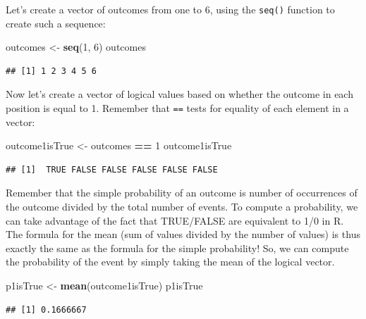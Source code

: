 \documentclass[
  12pt,
]{book}
\newenvironment{Shaded}{\begin{snugshade}}{\end{snugshade}}
\newcommand{\DecValTok}[1]{\textcolor[rgb]{0.00,0.00,0.81}{#1}}
\newcommand{\FunctionTok}[1]{\textcolor[rgb]{0.13,0.29,0.53}{\textbf{#1}}}
\newcommand{\NormalTok}[1]{#1}
\newcommand{\OtherTok}[1]{\textcolor[rgb]{0.56,0.35,0.01}{#1}}
\newcommand{\SpecialCharTok}[1]{\textcolor[rgb]{0.81,0.36,0.00}{\textbf{#1}}}
\begin{document}
Let's create a vector of outcomes from one to 6, using the \texttt{seq()} function to create such a sequence:

\begin{Shaded}
\begin{Highlighting}[]
\NormalTok{outcomes }\OtherTok{\textless{}{-}} \FunctionTok{seq}\NormalTok{(}\DecValTok{1}\NormalTok{, }\DecValTok{6}\NormalTok{)}
\NormalTok{outcomes}
\end{Highlighting}
\end{Shaded}

\begin{verbatim}
## [1] 1 2 3 4 5 6
\end{verbatim}

Now let's create a vector of logical values based on whether the outcome in each position is equal to 1. Remember that \texttt{==} tests for equality of each element in a vector:

\begin{Shaded}
\begin{Highlighting}[]
\NormalTok{outcome1isTrue }\OtherTok{\textless{}{-}}\NormalTok{ outcomes }\SpecialCharTok{==} \DecValTok{1} 
\NormalTok{outcome1isTrue}
\end{Highlighting}
\end{Shaded}

\begin{verbatim}
## [1]  TRUE FALSE FALSE FALSE FALSE FALSE
\end{verbatim}

Remember that the simple probability of an outcome is number of occurrences of the outcome divided by the total number of events. To compute a probability, we can take advantage of the fact that TRUE/FALSE are equivalent to 1/0 in R. The formula for the mean (sum of values divided by the number of values) is thus exactly the same as the formula for the simple probability! So, we can compute the probability of the event by simply taking the mean of the logical vector.

\begin{Shaded}
\begin{Highlighting}[]
\NormalTok{p1isTrue }\OtherTok{\textless{}{-}} \FunctionTok{mean}\NormalTok{(outcome1isTrue)}
\NormalTok{p1isTrue}
\end{Highlighting}
\end{Shaded}

\begin{verbatim}
## [1] 0.1666667
\end{verbatim}
\end{document}

